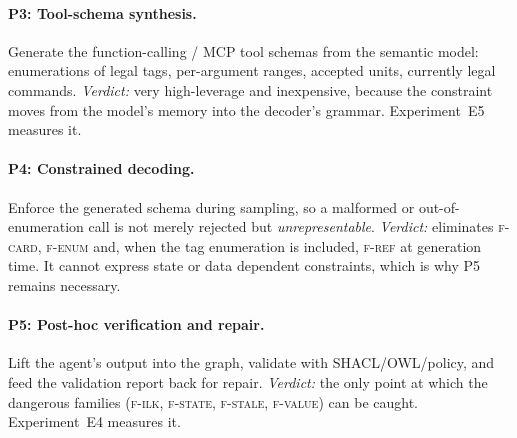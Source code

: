 \paragraph{P3: Tool-schema synthesis.} Generate the function-calling / MCP
tool schemas from the semantic model: enumerations of legal tags, per-argument
ranges, accepted units, currently legal commands. \emph{Verdict:} very
high-leverage and inexpensive, because the constraint moves from the model's
memory into the decoder's grammar. Experiment~E5 measures it.

\paragraph{P4: Constrained decoding.} Enforce the generated schema during
sampling, so a malformed or out-of-enumeration call is not merely rejected but
\emph{unrepresentable}. \emph{Verdict:} eliminates \textsc{f-card},
\textsc{f-enum} and, when the tag enumeration is included, \textsc{f-ref} at
generation time. It cannot express state or data dependent constraints, which
is why P5 remains necessary.

\paragraph{P5: Post-hoc verification and repair.} Lift the agent's output into
the graph, validate with SHACL/OWL/policy, and feed the validation report back
for repair. \emph{Verdict:} the only point at which the dangerous families
(\textsc{f-ilk}, \textsc{f-state}, \textsc{f-stale}, \textsc{f-value}) can be
caught. Experiment~E4 measures it.

